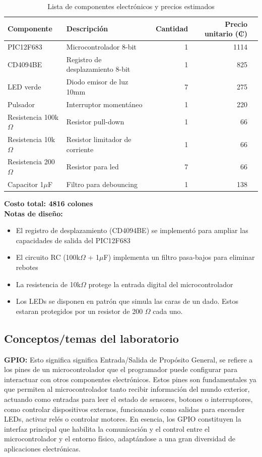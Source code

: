 \documentclass[12pt,a4paper]{article}
\begin{document}
\begin{table}[H]
  \centering
  \caption{Lista de componentes electrónicos y precios estimados}
  \label{tab:componentes}
  \begin{tabular}{@{}llrrr@{}}
  \toprule
  \textbf{Componente} & \textbf{Descripción} & \textbf{Cantidad} & \textbf{Precio unitario (₡)} \\ 
  \midrule
  PIC12F683 & Microcontrolador 8-bit & 1 & 1114 \\
  CD4094BE & Registro de desplazamiento 8-bit & 1 & 825 \\
  LED verde & Diodo emisor de luz 10mm & 7 & 275 \\
  Pulsador & Interruptor momentáneo & 1 & 220 \\
  Resistencia 100k$\Omega$ & Resistor pull-down & 1 & 66 \\
  Resistencia 10k$\Omega$ & Resistor limitador de corriente & 1 & 66 \\
  Resistencia 200$\Omega$ & Resistor para led & 7 & 66 \\
  Capacitor 1$\mu$F & Filtro para debouncing & 1 & 138 \\
  \bottomrule
  \end{tabular}
  \end{table}
  

  \textbf{Costo total: 4816 colones} \\

  \textbf{Notas de diseño:}
  \begin{itemize}
  \item El registro de desplazamiento (CD4094BE) se implementó 
        para ampliar las capacidades de salida del PIC12F683
  \item El circuito RC (100k$\Omega$ + 1$\mu$F) implementa un filtro pasa-bajos 
        para eliminar rebotes \cite{switchbounce}
  \item La resistencia de 10k$\Omega$ protege la entrada digital del microcontrolador
  
  \item Los LEDs se disponen en patrón que simula las caras de un dado.
        Estos estaran protegidos por un resistor de 200 $\Omega$ cada uno.
  \end{itemize}

\subsection{Conceptos/temas del laboratorio}
\textbf{GPIO:} Esto significa significa Entrada/Salida de Propósito General,
se refiere a los pines de un microcontrolador que el programador puede configurar
para interactuar con otros componentes electrónicos. Estos pines son fundamentales
ya que permiten al microcontrolador tanto recibir información del mundo exterior, 
actuando como entradas para leer el estado de sensores, botones o interruptores, 
como controlar dispositivos externos, funcionando como salidas para encender LEDs, 
activar relés o controlar motores. En esencia, los GPIO constituyen la interfaz principal 
que habilita la comunicación y el control entre el microcontrolador y el entorno físico, 
adaptándose a una gran diversidad de aplicaciones electrónicas.
\end{document}

